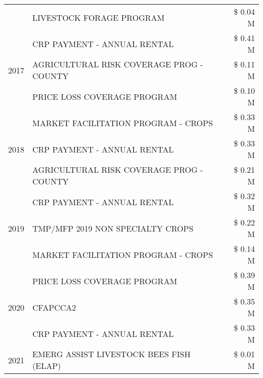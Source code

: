 \begin{tabular}{llr}
 & LIVESTOCK FORAGE PROGRAM & \$ 0.04 M \\
\cline{1-3}
\multirow[t]{3}{*}{2017} & CRP PAYMENT - ANNUAL RENTAL & \$ 0.41 M \\
 & AGRICULTURAL RISK COVERAGE PROG - COUNTY & \$ 0.11 M \\
 & PRICE LOSS COVERAGE PROGRAM & \$ 0.10 M \\
\cline{1-3}
\multirow[t]{3}{*}{2018} & MARKET FACILITATION PROGRAM - CROPS & \$ 0.33 M \\
 & CRP PAYMENT - ANNUAL RENTAL & \$ 0.33 M \\
 & AGRICULTURAL RISK COVERAGE PROG - COUNTY & \$ 0.21 M \\
\cline{1-3}
\multirow[t]{3}{*}{2019} & CRP PAYMENT - ANNUAL RENTAL & \$ 0.32 M \\
 & TMP/MFP 2019 NON SPECIALTY CROPS & \$ 0.22 M \\
 & MARKET FACILITATION PROGRAM - CROPS & \$ 0.14 M \\
\cline{1-3}
\multirow[t]{3}{*}{2020} & PRICE LOSS COVERAGE PROGRAM & \$ 0.39 M \\
 & CFAPCCA2 & \$ 0.35 M \\
 & CRP PAYMENT - ANNUAL RENTAL & \$ 0.33 M \\
\cline{1-3}
2021 & EMERG ASSIST LIVESTOCK BEES FISH (ELAP) & \$ 0.01 M \\
\cline{1-3}
\bottomrule
\end{tabular}
